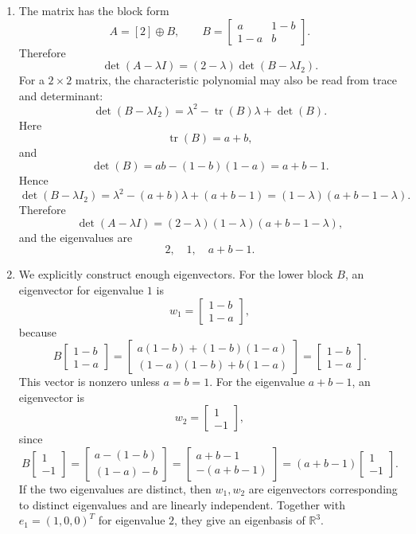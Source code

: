 \documentclass[12pt]{article}
\newcommand{\R}{\mathbb{R}}
\newcommand{\tr}{\operatorname{tr}}
\begin{document}
\begin{enumerate}[label=(\alph*)]
  \item The matrix has the block form
  \[
  A=[2]\oplus B,
  \qquad
  B=\begin{bmatrix}a&1-b\\1-a&b\end{bmatrix}.
  \]
  Therefore
  \[
  \det(A-\lambda I)=(2-\lambda)\det(B-\lambda I_2).
  \]
  For a $2\times2$ matrix, the characteristic polynomial may also be read from trace and determinant:
  \[
  \det(B-\lambda I_2)=\lambda^2-\tr(B)\lambda+\det(B).
  \]
  Here
  \[
  \tr(B)=a+b,
  \]
  and
  \[
  \det(B)=ab-(1-b)(1-a)=a+b-1.
  \]
  Hence
  \[
  \det(B-\lambda I_2)=\lambda^2-(a+b)\lambda+(a+b-1)=(1-\lambda)(a+b-1-\lambda).
  \]
  Therefore
  \[
  \boxed{\det(A-\lambda I)=(2-\lambda)(1-\lambda)(a+b-1-\lambda),}
  \]
  and the eigenvalues are
  \[
  \boxed{2,\quad1,\quad a+b-1.}
  \]

  \item We explicitly construct enough eigenvectors. For the lower block $B$, an eigenvector for eigenvalue $1$ is
  \[
  w_1=\begin{bmatrix}1-b\\1-a\end{bmatrix},
  \]
  because
  \[
  B\begin{bmatrix}1-b\\1-a\end{bmatrix}
  =\begin{bmatrix}a(1-b)+(1-b)(1-a)\\(1-a)(1-b)+b(1-a)\end{bmatrix}
  =\begin{bmatrix}1-b\\1-a\end{bmatrix}.
  \]
  This vector is nonzero unless $a=b=1$. For the eigenvalue $a+b-1$, an eigenvector is
  \[
  w_2=\begin{bmatrix}1\\-1\end{bmatrix},
  \]
  since
  \[
  B\begin{bmatrix}1\\-1\end{bmatrix}
  =\begin{bmatrix}a-(1-b)\\(1-a)-b\end{bmatrix}
  =\begin{bmatrix}a+b-1\\-(a+b-1)\end{bmatrix}
  =(a+b-1)\begin{bmatrix}1\\-1\end{bmatrix}.
  \]
  If the two eigenvalues are distinct, then $w_1,w_2$ are eigenvectors corresponding to distinct eigenvalues and are linearly independent. Together with $e_1=(1,0,0)^T$ for eigenvalue $2$, they give an eigenbasis of $\R^3$.


\end{enumerate}
\end{document}
